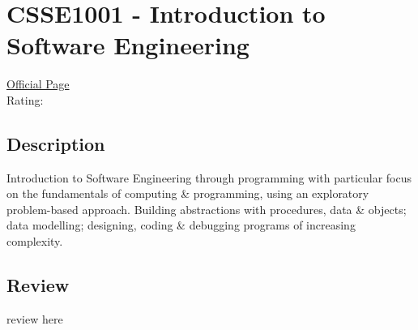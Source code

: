 \hypertarget{CSSE1001}{\section{CSSE1001 - Introduction to Software Engineering}}

\large
\textcolor{turbo_purple}{\href{https://my.uq.edu.au/programs-courses/course.html?course_code=CSSE1001}{Official Page}} \\
Rating: \cstar\cstar\cstar\cstar\ostar

\normalsize
\subsection*{Description}
Introduction to Software Engineering through programming with particular focus on the fundamentals of computing \& programming, using an exploratory problem-based approach.
Building abstractions with procedures, data \& objects; data modelling; designing, coding \& debugging programs of increasing complexity.

\subsection*{Review}
review here

